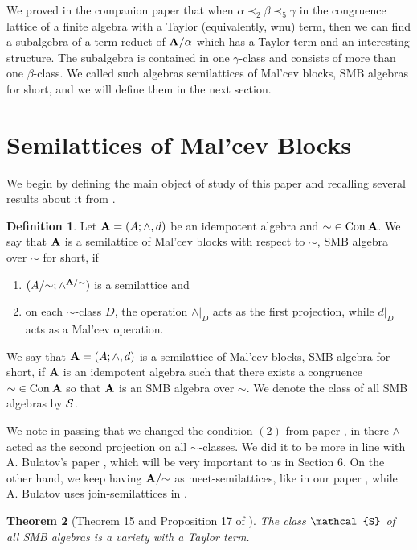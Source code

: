 \documentclass[11pt]{amsart}
\newcommand{\m}[1]{{\uppercase {\mathbf {#1}}}}
\newcommand{\sm}[1]{{\mbox{\scriptsize {\uppercase {\bf {#1}}}}}}
\newcommand{\vr}[1]{{\uppercase {\mathcal{#1}}}}
\newcommand{\con}{{\rm Con\:}}
\newcommand{\cn}[1]{{\con\m {#1}}}
\newcommand{\mt}{\wedge}
\newtheorem{thm}{Theorem}[section]
\theoremstyle{definition}
\newtheorem{df}[thm]{Definition}
\begin{document}
We proved in the companion paper \cite{SMB1} that when $\alpha\prec_2\beta\prec_5\gamma$ in the congruence lattice of a finite algebra with a Taylor (equivalently, wnu) term, then we can find a subalgebra of a term reduct of $\m a/\alpha$ which has a Taylor term and an interesting structure. The subalgebra is contained in one $\gamma$-class and consists of more than one $\beta$-class. We called such algebras semilattices of Mal'cev blocks, SMB algebras for short, and we will define them in the next section.


\section{Semilattices of Mal'cev Blocks}

We begin by defining the main object of study of this paper and recalling several results about it from \cite{SMB1}.

\begin{df}\label{SMBdef}
Let $\m A=(A; \mt ,d)$ be an idempotent algebra and ${\sim}\in\cn a$. We say that $\m a$ is a semilattice of Mal'cev blocks with respect to ${\sim}$, SMB algebra over ${\sim}$ for short, if
\begin{enumerate}
\item $(A/{\sim};\mt^{\sm a/{\sim}})$ is a semilattice and
\item on each ${\sim}$-class $D$, the operation $\mt|_{D}$ acts as the first projection, while $d|_{D}$ acts as a Mal'cev operation.
\end{enumerate}
We say that $\m A=(A; \mt ,d)$ is a semilattice of Mal'cev blocks, SMB algebra for short, if $\m A$ is an idempotent algebra such that there exists a congruence ${\sim} \in \cn A$ so that $\m a$ is an SMB algebra over ${\sim}$. We denote the class of all SMB algebras by $\vr S$.
\end{df}

We note in passing that we changed the condition $(2)$ from paper \cite{SMB1}, in there $\mt$ acted as the second projection on all $\sim$-classes. We did it to be more in line with A. Bulatov's paper \cite{BuSMB}, which will be very important to us in Section 6. On the other hand, we keep having $\m a/{\sim}$ as meet-semilattices, like in our paper \cite{SMB1}, while A. Bulatov uses join-semilattices in \cite{BuSMB}.

\begin{thm}[Theorem 15 and Proposition 17 of \cite{SMB1}]\label{SMBvar}
The class $\vr s$ of all SMB algebras is a variety with a Taylor term.
\end{thm}
\end{document}

